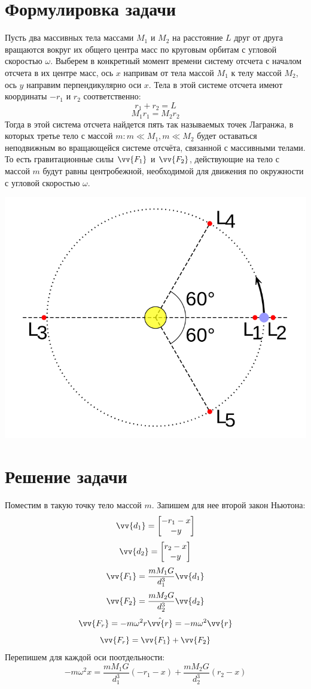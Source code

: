 \documentclass{article}
\begin{document}
    \onehalfspacing
    
    \section*{Формулировка задачи}
    Пусть два массивных тела массами $M_1$ и $M_2$ на расстояние $L$ друг от друга вращаются вокруг их общего центра масс по круговым орбитам с угловой скоростью $\omega$.
    Выберем в конкретный момент времени систему отсчета с началом отсчета в их центре масс, ось $x$ напривам от тела массой $M_1$ к телу  массой $M_2$,
    ось $y$ направим перпендикулярно оси $x$. Тела в этой системе отсчета имеют координаты $-r_1$ и $r_2$ соответственно:
    \[ r_1 + r_2 = L \]
    \[ M_1 r_1 = M_2 r_2 \]
    Тогда в этой система отсчета найдется пять так называемых точек Лагранжа, в которых третье тело с массой $m: m \ll M_1, m \ll M_2$
    будет оставаться неподвижным во вращающейся системе отсчёта, связанной с массивными телами. То есть гравитационные силы $\vv{F_1}$ и $\vv{F_2}$,
    действующие на тело с массой $m$ будут равны центробежной, необходимой для движения по окружности с угловой скоростью $\omega$.
    
    \includegraphics[scale=0.5]{Lagrange_very_massive.png}
    
    \section*{Решение задачи}
    Поместим в такую точку тело массой $m$. Запишем для нее второй закон Ньютона:
    \[ \vv{d_1} = \begin{bmatrix} -r_1 - x \\ - y \end{bmatrix} \]
    \[ \vv{d_2} = \begin{bmatrix} r_2 - x \\ - y \end{bmatrix} \]
    \[ \vv{F_1} = \frac{mM_1G}{d_1^3} \vv{d_1} \]
    \[ \vv{F_2} = \frac{mM_2G}{d_2^3} \vv{d_2} \]
    \[ \vv{F_r} = - m \omega^2 r \hat{{\vv{r}}} = - m \omega^2 \vv{r} \]
    \[ \vv{F_r} = \vv{F_1} + \vv{F_2}  \]
    Перепишем для каждой оси поотдельности:
    \[ - m \omega^2 x =
       \frac{mM_1G}{d_1^3} (-r_1 - x) + \frac{mM_2G}{d_2^3} (r_2 - x) \]
    
\end{document}

